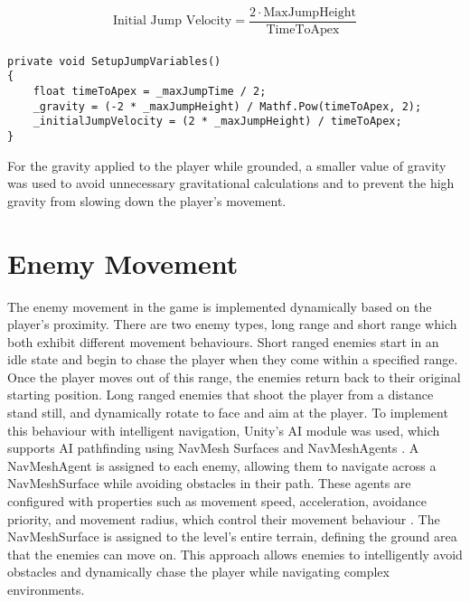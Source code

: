 \documentclass[10pt]{final_report}
\begin{document}
\begin{equation}
\text{Initial Jump Velocity} = \frac{2 \cdot \text{MaxJumpHeight}}{\text{TimeToApex}}
\end{equation}
\paragraph{}
\begin{verbatim}
private void SetupJumpVariables()
{
    float timeToApex = _maxJumpTime / 2;
    _gravity = (-2 * _maxJumpHeight) / Mathf.Pow(timeToApex, 2);
    _initialJumpVelocity = (2 * _maxJumpHeight) / timeToApex;
}
\end{verbatim}
For the gravity applied to the player while grounded, a smaller value of gravity was used to avoid unnecessary gravitational calculations and to prevent the high gravity from slowing down the player's movement. \newline

\section{Enemy Movement}\label{enemy_movement}
The enemy movement in the game is implemented dynamically based on the player's proximity. There are two enemy types, long range and short range which both exhibit different movement behaviours. Short ranged enemies start in an idle state and begin to chase the player when they come within a specified range. Once the player moves out of this range, the enemies return back to their original starting position. Long ranged enemies that shoot the player from a distance stand still, and dynamically rotate to face and aim at the player. To implement this behaviour with intelligent navigation, Unity's AI module was used, which supports AI pathfinding using NavMesh Surfaces and NavMeshAgents \cite{unity2024_AI}. 
A NavMeshAgent is assigned to each enemy, allowing them to navigate across a NavMeshSurface while avoiding obstacles in their path. These agents are configured with properties such as movement speed, acceleration, avoidance priority, and movement radius, which control their movement behaviour \cite{unity2024_NavAgent}. The NavMeshSurface is assigned to the level's entire terrain, defining the ground area that the enemies can move on. This approach allows enemies to intelligently avoid obstacles and dynamically chase the player while navigating complex environments. \newline
\end{document}
